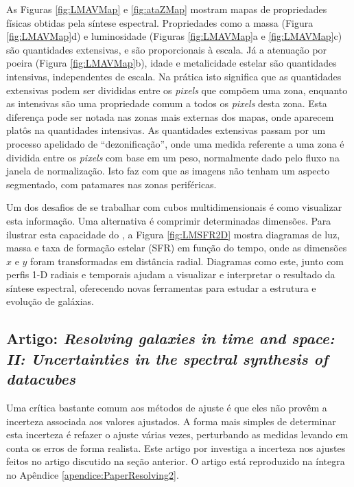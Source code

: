 As Figuras \ref{fig:LMAVMap} e \ref{fig:ataZMap} mostram mapas de propriedades
físicas obtidas pela síntese espectral. Propriedades como a massa (Figura
\ref{fig:LMAVMap}d) e luminosidade (Figuras \ref{fig:LMAVMap}a e
\ref{fig:LMAVMap}c) são quantidades extensivas, e são proporcionais à escala. Já
a atenuação por poeira (Figura \ref{fig:LMAVMap}b), idade e metalicidade estelar
são quantidades intensivas, independentes de escala. Na prática isto significa
que as quantidades extensivas podem ser divididas entre os {\em pixels} que
compõem uma zona, enquanto as intensivas são uma propriedade comum a todos os
{\em pixels} desta zona. Esta diferença pode ser notada nas zonas mais externas
dos mapas, onde aparecem platôs na quantidades intensivas. As quantidades
extensivas passam por um processo apelidado de ``dezonificação'', onde uma
medida referente a uma zona é dividida entre os {\em pixels} com base em um
peso, normalmente dado pelo fluxo na janela de normalização. Isto faz com que as
imagens não tenham um aspecto segmentado, com patamares nas zonas periféricas.

Um dos desafios de se trabalhar com cubos multidimensionais é como visualizar
esta informação. Uma alternativa é comprimir determinadas dimensões. Para
ilustrar esta capacidade do \pycasso, a Figura \ref{fig:LMSFR2D} mostra diagramas
de luz, massa e taxa de formação estelar (SFR) em função do tempo, onde as
dimensões $x$ e $y$ foram transformadas em distância radial. Diagramas como
este, junto com perfis 1-D radiais e temporais ajudam a visualizar e interpretar
o resultado da síntese espectral, oferecendo novas ferramentas para estudar a
estrutura e evolução de galáxias.



\subsection{Artigo: {\em Resolving galaxies in time and space: II: Uncertainties
in the spectral synthesis of datacubes}}
\label{sec:pycasso:art:Resolving2}

Uma crítica bastante comum aos métodos de ajuste é que eles não provêm a
incerteza associada aos valores ajustados. A forma mais simples de determinar
esta incerteza é refazer o ajuste várias vezes, perturbando as medidas levando
em conta os erros de forma realista. Este artigo por \citet{CidFernandes2013}
investiga a incerteza nos ajustes feitos no artigo discutido na seção anterior.
O artigo está reproduzido na íntegra no Apêndice \ref{apendice:PaperResolving2}.

